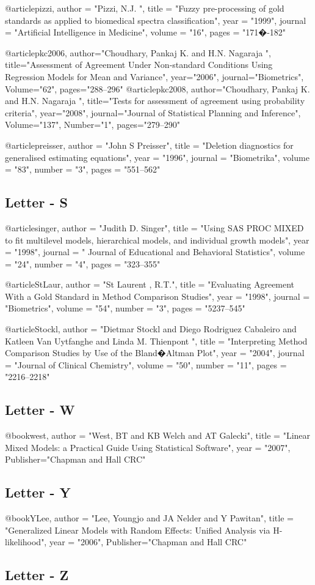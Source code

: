 @article{pizzi,
	author = "Pizzi, N.J. ",
	title = "Fuzzy pre-processing of gold standards as applied to biomedical spectra classification",
	year = "1999",
	journal = "Artificial Intelligence in Medicine",
	volume = "16",
	pages = "171�-182"
}

@article{pkc2006,
	author="Choudhary, Pankaj K. and H.N. Nagaraja ",
	title="Assessment of Agreement Under Non-standard Conditions Using
	Regression Models for Mean and Variance",
	year="2006",
	journal="Biometrics",
	Volume="62",
	pages="288--296"
}
@article{pkc2008,
	author="Choudhary, Pankaj K. and H.N. Nagaraja ",
	title="Tests for assessment of agreement using probability criteria",
	year="2008",
	journal="Journal of Statistical Planning and Inference",
	Volume="137",
	Number="1",
	pages="279--290"
}

@article{preisser,
	author = "John S Preisser",
	title = "Deletion diagnostics for generalised estimating equations",
	year = "1996",
	journal = "Biometrika",
	volume = "83",
	number = "3",
	pages = "551--562"
}

\subsection*{Letter - S}

@article{singer,
	author = "Judith D. Singer",
	title = "Using SAS PROC MIXED to fit multilevel models, hierarchical models, and individual growth models",
	year = "1998",
	journal = " Journal of Educational and Behavioral Statistics",
	volume = "24",
	number = "4",
	pages = "323--355"
}


@article{StLaur,
	author = "St Laurent , R.T.",
	title = "Evaluating Agreement With a Gold Standard in Method Comparison Studies",
	year = "1998",
	journal = "Biometrics",
	volume = "54",
	number = "3",
	pages = "5237--545"
}

@article{Stockl,
	author = "Dietmar Stockl and Diego Rodriguez Cabaleiro and Katleen Van Uytfanghe and Linda M. Thienpont ",
	title = "Interpreting Method Comparison Studies by Use of the Bland�Altman Plot",
	year = "2004",
	journal = "Journal of Clinical Chemistry",
	volume = "50",
	number = "11",
	pages = "2216--2218"
}

\subsection*{Letter - W}

@book{west,
	author = "West, BT and  KB Welch and AT Galecki",
	title = "Linear Mixed Models: a Practical Guide Using Statistical Software",
	year = "2007",
	Publisher="Chapman and Hall CRC"
}

\subsection*{Letter - Y}
@book{YLee,
	author = "Lee, Youngjo and JA Nelder and Y Pawitan",
	title = "Generalized Linear Models with Random Effects: Unified Analysis via H-likelihood",
	year = "2006",
	Publisher="Chapman and Hall CRC"
}

\subsection*{Letter - Z}